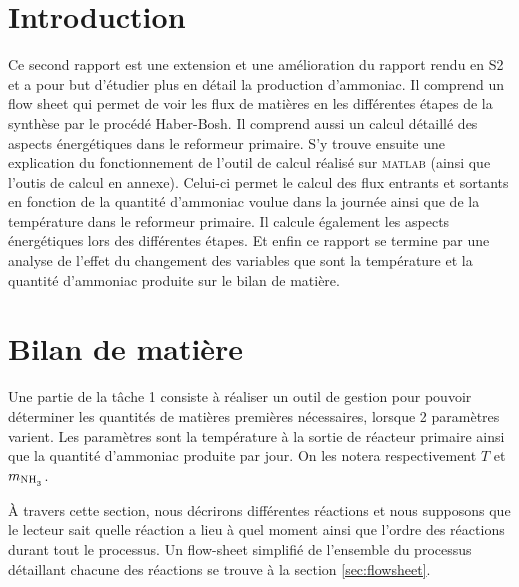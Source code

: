 




\section{Introduction}

Ce second rapport est une extension et une amélioration du rapport rendu 
en S2 et a pour but d'étudier plus en détail la production d'ammoniac. 
Il comprend un flow sheet qui permet de voir les flux de matières en 
les différentes étapes de la synthèse par le procédé Haber-Bosh. 
Il comprend aussi un calcul détaillé des aspects énergétiques dans le reformeur primaire.
S’y trouve ensuite une explication du fonctionnement de l’outil de calcul
réalisé sur \textsc{matlab} (ainsi que l'outis de calcul en annexe).
Celui-ci permet le calcul des flux entrants et sortants en fonction 
de la quantité d'ammoniac voulue dans la journée ainsi que de la 
température dans le reformeur primaire. Il calcule également les aspects énergétiques 
lors des différentes étapes. 
Et enfin ce rapport se termine par une analyse de l'effet du changement 
des variables que sont la température et la quantité d'ammoniac produite 
sur le bilan de matière.

\section{Bilan de matière}
\label{sec:bilan_matiere}

Une partie de la t\^ache 1 consiste à réaliser un outil de gestion
pour pouvoir déterminer les quantités de matières premières nécessaires,
lorsque 2 paramètres varient. 
Les paramètres sont la température à la sortie de réacteur primaire ainsi
que la quantité d'ammoniac produite par jour. 
On les notera respectivement $T$ et $m_{\ce{NH3}}$.

À travers cette section, nous décrirons différentes réactions et nous 
supposons que le lecteur sait quelle réaction a lieu à quel moment ainsi 
que l'ordre des réactions durant tout le processus.
Un flow-sheet simplifié de l'ensemble du processus détaillant chacune
des réactions se trouve à la section \ref{sec:flowsheet}.

